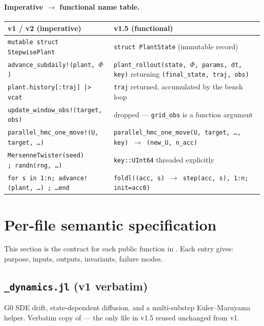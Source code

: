 \documentclass[11pt,a4paper]{article}
\begin{document}
\paragraph{Imperative $\to$ functional name table.}

\noindent
\begin{tabular}{@{}p{}p{}@{}}
\toprule
v1 / v2 (imperative) & v1.5 (functional) \\
\midrule
\texttt{mutable struct StepwisePlant} & \texttt{struct PlantState} (immutable record) \\
\texttt{advance\_subdaily!(plant, $\Phi$)} & \texttt{plant\_rollout(state, $\Phi$, params, dt, key)} returning \texttt{(final\_state, traj, obs)} \\
\texttt{plant.history[:traj] |> vcat} & \texttt{traj} returned, accumulated by the bench loop \\
\texttt{update\_window\_obs!(target, obs)} & dropped --- \texttt{grid\_obs} is a function argument \\
\texttt{parallel\_hmc\_one\_move!(U, target, \dots)} & \texttt{parallel\_hmc\_one\_move(U, target, \dots, key)\,$\to$\,(new\_U, n\_acc)} \\
\texttt{MersenneTwister(seed) ;\ randn(rng, \dots)} & \texttt{key::UInt64} threaded explicitly \\
\texttt{for s in 1:n; advance!(plant, \dots) ; \dots end} & \texttt{foldl((acc, s)\,$\to$\,step(acc, s), 1:n; init=acc0)} \\
\bottomrule
\end{tabular}

\section{Per-file semantic specification}
\label{sec:files}

This section is the contract for each public function in
. Each entry gives: purpose, inputs,
outputs, invariants, failure modes.

\subsection{\texttt{\_dynamics.jl} (v1 verbatim)}

G0 SDE drift, state-dependent diffusion, and a multi-substep
Euler--Maruyama helper. Verbatim copy of
 --- the
only file in v1.5 reused unchanged from v1.
\end{document}

